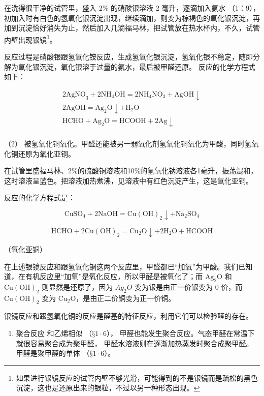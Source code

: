 在洗得很干净的试管里，盛入 2\% 的硝酸银溶液 2 毫升，逐滴加入氨水
（1：9），初加入时有白色的氢氧化银沉淀出现，继续滴加，则变为棕褐色的氧化银沉淀，再加到沉淀恰好消失为止，然后加入几滴福马林，把试管放在热水杯内，不久，试管内壁出现银镜\footnote{如果进行银镜反应的试管内壁不够光滑，可能得到的不是银镜而是疏松的黑色沉淀，这也是还原出来的银粒，不过以另一种形态出现。}。

反应过程是硝酸银跟氢氧化铵反应，生成氢氧化银沉淀，氢氧化银不稳定，随即分解为氧化银沉淀，氧化银溶于过量的氨水，最后被甲醛还原。
反应的化学方程式如下：

\[
\begin{array}{l} 2 \mathrm{AgNO} _ {3} + 2 \mathrm{NH} _ {4} \mathrm{OH} = 2 \mathrm{NH} _ {4} \mathrm{NO} _ {3} + \mathrm{AgOH} \downarrow \\ 2 \mathrm{AgOH} = \mathrm{Ag} _ {2} \mathrm{O} \downarrow + \mathrm{H} _ {2} \mathrm{O} \\ \mathrm{HCHO} + \mathrm{Ag} _ {2} \mathrm{O} = \mathrm{HCOOH} + 2 \mathrm{Ag} \downarrow \\ \end{array}
\]

（2）
被氢氧化铜氧化。甲醛还能被另一弱氧化剂氢氧化铜氧化为甲酸，同时氢氧化铜还原为氧化亚铜。

在试管里盛福马林、2\%的硫酸铜溶液和10\%的氢氧化钠溶液各1毫升，振荡混和，这时溶液呈蓝色。把溶液加热煮沸，见溶液中有红色沉淀产生，这是氧化亚铜。

反应的化学方程式是：

\[
\mathrm{CuSO} _ {4} + 2 \mathrm{NaOH} = \mathrm{Cu(OH)} _ {2} \downarrow + \mathrm{Na} _ {2} \mathrm{SO} _ {4}
\]

\[
\mathrm{HCHO} + 2 \mathrm{Cu(OH)} _ {2} = \mathrm{Cu} _ {2} \mathrm{O} \downarrow + 2 \mathrm{H} _ {2} \mathrm{O} + \mathrm{HCOOH}
\]

（氧化亚铜）

在上述银镜反应和跟氢氧化铜这两个反应里，甲醛都已``加氧''为甲酸。我们已知道，在有机反应里``加氧''是氧化反应，所以甲醛是被氧化了；而
\(\mathrm{Ag_{2}O}\) 和 \(\mathrm{Cu(OH)_{2}}\) 则显然是还原了，因为
\(Ag_{2}O\) 变为银是由正一价银变为 0 价，而 \(\mathrm{Cu(OH)_{2}}\) 变为
\(\mathrm{Cu_{2}O}\)，是由正二价铜变为正一价铜。

银镜反应和跟氢氧化铜的反应是醛基的特征反应，利用它们可以检验醛的存在。

\begin{enumerate}[start=3]
\item
  聚合反应 和乙烯相似 （\(§1\cdot6\)），
  甲醛也能发生聚合反应。气态甲醛在常温下就很容易聚合成为聚甲醛，
  甲醛水溶液则在逐渐加热蒸发时聚合成聚甲醛。甲醛是聚甲醛的单体
  （\(§1\cdot6\)）。
\end{enumerate}


